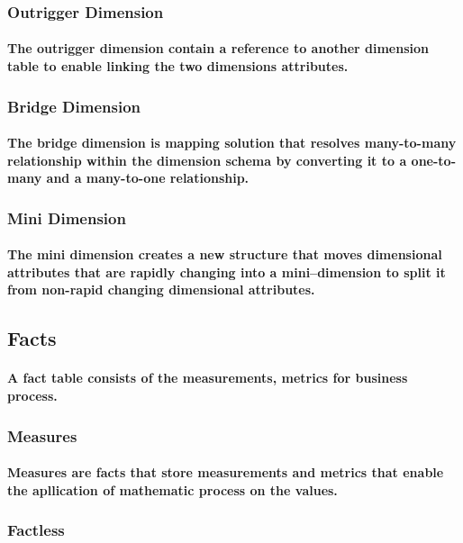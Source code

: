 \documentclass{acm_proc_article-sp}
\begin{document}
\subsubsection{Outrigger Dimension}
\paragraph{The outrigger dimension contain a reference to another dimension table to enable linking the two dimensions attributes.}
\subsubsection{Bridge Dimension}
\paragraph{The bridge dimension is mapping solution that resolves many-to-many relationship within the dimension schema by converting it to a one-to-many and a many-to-one relationship.}
\subsubsection{Mini Dimension}
\paragraph{The mini dimension creates a new structure that moves dimensional attributes that are rapidly changing into a mini–dimension to split it from non-rapid changing dimensional attributes.}
\subsection{Facts}
\paragraph{A fact table consists of the measurements, metrics for business process.}
\subsubsection{Measures}
\paragraph{Measures are facts that store measurements and metrics that enable the apllication of mathematic process on the values.}
\subsubsection{Factless}
\end{document}
